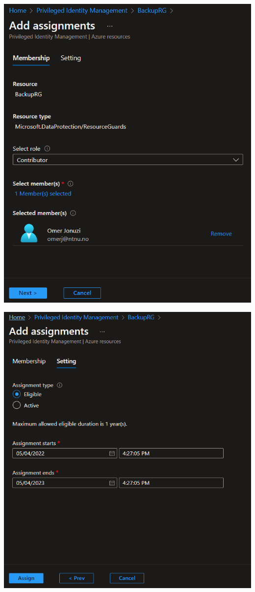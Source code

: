 \includegraphics[width=.9\linewidth]{figures/RG-AddAssignment.PNG}

\includegraphics[width=.9\linewidth]{figures/RG-eligible.png}

